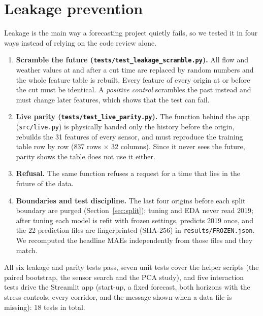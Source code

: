 \documentclass[11pt,a4paper]{article}
\newcommand{\code}[1]{\texttt{#1}}
\begin{document}
\begin{table}[H]\centering\small

\caption{The feature groups.}\label{tab:features}
\end{table}

\section{Leakage prevention}
Leakage is the main way a forecasting project quietly fails, so we tested it in four ways instead of relying on the code review alone.
\begin{enumerate}
\item \textbf{Scramble the future (\code{tests/test\_leakage\_scramble.py}).} All flow and weather values at and after a cut time are replaced by random numbers and the whole feature table is rebuilt.
Every feature of every origin at or before the cut must be identical. A \emph{positive control} scrambles the past instead and must change later features, which shows that the test can fail.
\item \textbf{Live parity (\code{tests/test\_live\_parity.py}).} The function behind the app (\code{src/live.py}) is physically handed only the history before the origin, rebuilds the 31 features of every sensor, and must reproduce the training table row by row
(837 rows $\times$ 32 columns). Since it never sees the future, parity shows the table does not use it either.
\item \textbf{Refusal.} The same function refuses a request for a time that lies in the future of the data.
\item \textbf{Boundaries and test discipline.} The last four origins before each split boundary are purged (Section~\ref{sec:split}); tuning and EDA never read 2019; after tuning each model is refit with frozen settings, predicts 2019 once,
and the 22 prediction files are fingerprinted (SHA-256) in \code{results/FROZEN.json}. We recomputed the headline MAEs independently from those files and they match.
\end{enumerate}
All six leakage and parity tests pass, seven unit tests cover the helper scripts (the paired bootstrap, the sensor search and the PCA study), and five interaction tests drive the Streamlit app (start-up, a fixed forecast, both horizons with the stress controls, every corridor, and the message shown when a data file is missing): 18 tests in total.
\end{document}
